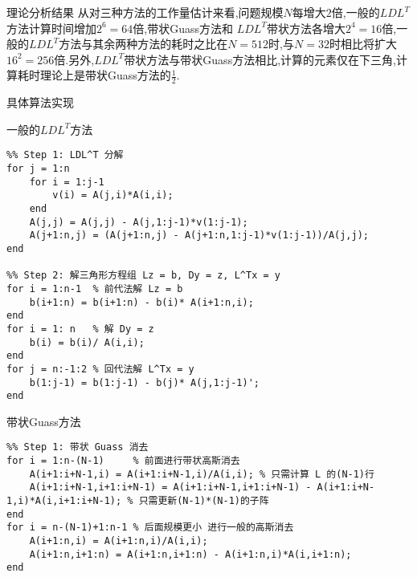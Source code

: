 \documentclass{article}
\begin{document}
\begin{section}{理论分析结果}
    从对三种方法的工作量估计来看,问题规模$N$每增大$2$倍,一般的$LDL^T$方法计算时间增加$2^6=64$倍,带状Guass方法和
    $LDL^T$带状方法各增大$2^4=16$倍,一般的$LDL^T$方法与其余两种方法的耗时之比在$N=512$时,与$N=32$时相比将扩大
    $16^2=256$倍.另外,$LDL^T$带状方法与带状Guass方法相比,计算的元素仅在下三角,计算耗时理论上是带状Guass方法的$\frac{1}{2}$.
\end{section}
\newpage
\begin{section}{具体算法实现}
    \begin{subsection}{一般的$LDL^T$方法}
        \begin{lstlisting}
%% Step 1: LDL^T 分解
for j = 1:n
    for i = 1:j-1
        v(i) = A(j,i)*A(i,i);
    end
    A(j,j) = A(j,j) - A(j,1:j-1)*v(1:j-1);
    A(j+1:n,j) = (A(j+1:n,j) - A(j+1:n,1:j-1)*v(1:j-1))/A(j,j);
end

%% Step 2: 解三角形方程组 Lz = b, Dy = z, L^Tx = y
for i = 1:n-1  % 前代法解 Lz = b
    b(i+1:n) = b(i+1:n) - b(i)* A(i+1:n,i);
end
for i = 1: n   % 解 Dy = z
    b(i) = b(i)/ A(i,i);
end
for j = n:-1:2 % 回代法解 L^Tx = y
    b(1:j-1) = b(1:j-1) - b(j)* A(j,1:j-1)';
end
        \end{lstlisting}   
    \end{subsection}
    \begin{subsection}{带状Guass方法}
        \begin{lstlisting}
%% Step 1: 带状 Guass 消去
for i = 1:n-(N-1)     % 前面进行带状高斯消去 
    A(i+1:i+N-1,i) = A(i+1:i+N-1,i)/A(i,i); % 只需计算 L 的(N-1)行
    A(i+1:i+N-1,i+1:i+N-1) = A(i+1:i+N-1,i+1:i+N-1) - A(i+1:i+N-1,i)*A(i,i+1:i+N-1); % 只需更新(N-1)*(N-1)的子阵
end
for i = n-(N-1)+1:n-1 % 后面规模更小 进行一般的高斯消去
    A(i+1:n,i) = A(i+1:n,i)/A(i,i);
    A(i+1:n,i+1:n) = A(i+1:n,i+1:n) - A(i+1:n,i)*A(i,i+1:n);
end


\end{lstlisting}
\end{subsection}
\end{section}
\end{document}
